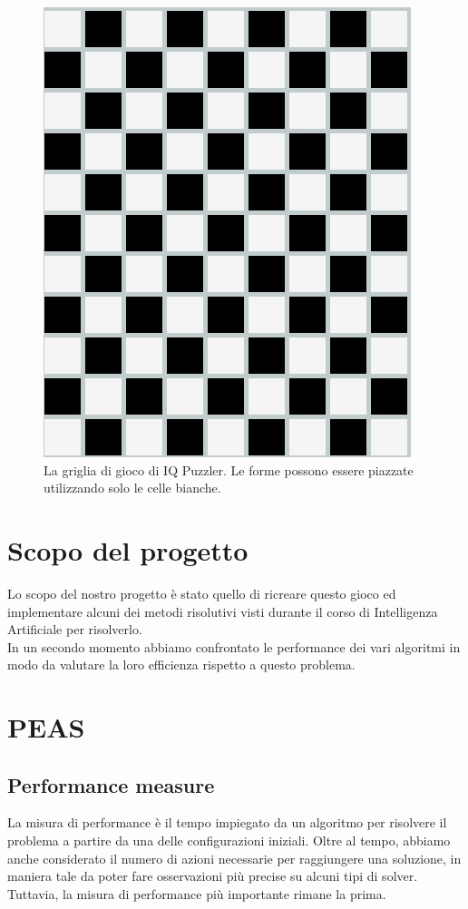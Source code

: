\begin{figure}[h]
	\centering
	\includegraphics[scale=0.3]{immagini/griglia}
	\caption{La griglia di gioco di IQ Puzzler. Le forme possono essere piazzate utilizzando solo le celle bianche.}
	\label{fig:griglia}
\end{figure}


\newpage
\section{Scopo del progetto}
Lo scopo del nostro progetto è stato quello di ricreare questo gioco ed implementare alcuni dei metodi risolutivi visti durante il corso di Intelligenza Artificiale per risolverlo. \\
In un secondo momento abbiamo confrontato le performance dei vari algoritmi in modo da valutare la loro efficienza rispetto a questo problema.

\section{PEAS}

\subsection{Performance measure}
\label{performance}
La misura di performance è il tempo impiegato da un algoritmo per risolvere il problema a partire da una delle configurazioni iniziali. Oltre al tempo, abbiamo anche considerato il numero di azioni necessarie per raggiungere una soluzione, in maniera tale da poter fare osservazioni più precise su alcuni tipi di solver.\\
Tuttavia, la misura di performance più importante rimane la prima.

